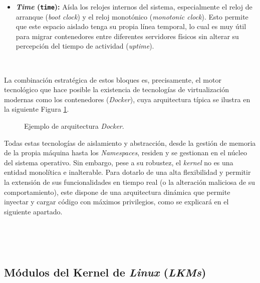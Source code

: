 \begin{itemize}
    Esto oculta la jerarquía de políticas y límites de recursos (como \textit{CPU} o memoria) establecidos por el \textit{kernel}, evitando que un proceso aislado los conozca o intente modificarlos.
    \item \textbf{\textit{Time} (\texttt{time}):} Aísla los relojes internos del sistema, especialmente el reloj de arranque (\textit{boot clock}) y el reloj monotónico (\textit{monotonic clock}).
    Esto permite que este espacio aislado tenga su propia línea temporal, lo cual es muy útil para migrar contenedores entre diferentes servidores físicos sin alterar su percepción del tiempo de actividad (\textit{uptime}).
\end{itemize}

\

La combinación estratégica de estos bloques es, precisamente, el motor tecnológico que hace posible la existencia de tecnologías de virtualización modernas como los contenedores (\textit{Docker}),
cuya arquitectura típica se ilustra en la siguiente Figura \ref{fig:ns-docker}.

\begin{figure}[h!]
  \centering
  \scalebox{0.8}{}
  \caption{Ejemplo de arquitectura \textit{Docker}.}
  \label{fig:ns-docker}
\end{figure}

Todas estas tecnologías de aislamiento y abstracción, desde la gestión de memoria de la propia máquina hasta los \textit{Namespaces}, residen y se gestionan en el núcleo del sistema operativo.
Sin embargo, pese a su robustez, el \textit{kernel} no es una entidad monolítica e inalterable.
Para dotarlo de una alta flexibilidad y permitir la extensión de sus funcionalidades en tiempo real (o la alteración maliciosa de su comportamiento), este dispone de una arquitectura dinámica que permite inyectar y cargar código con máximos privilegios, como se explicará en el siguiente apartado.

\

\

\subsection{Módulos del Kernel de \textit{Linux} (\textit{LKMs})}
\label{sec:lkms}

